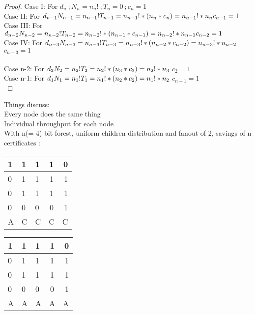 \begin{proof}

	Case I: For $d_{n}\ ; N_{n} = n_{n}!\ ; T_{n} = 0\ ; c_{n} = 1 $\\
	Case II: For $d_{n - 1}\\ N_{n - 1} = n_{n - 1}!\\ T_{n - 1} = n_{n - 1}! * (n_{n} * c_{n}) = n_{n - 1}! * n_{n}\\ c_{n - 1} = 1\\ $
	Case III: For $d_{n - 2}\\ N_{n - 2} = n_{n - 2}!\\ T_{n -2} = n_{n - 2}! * (n_{n - 1} * c_{n - 1}) = n_{n - 2}! * n_{n - 1 } \\ c_{n - 2} = 1$\\
	Case IV: For $d_{n - 3}\\ N_{n - 3} = n_{n - 3}!\\ T_{n -3} = n_{n - 3}! * (n_{n - 2} * c_{n - 2}) = n_{n - 3}! * n_{n - 2 } \\$     $c_{n - 3} = 1$\\ \\
	Case n-2: For $d_{2}\\ N_{2} = n_{2}!\\ T_{2} = n_{2}! * (n_{3} * c_{3}) = n_{2}! * n_{3} \\$  $c_{2} = 1$\\
	Case n-1: For $d_{1}\\ N_{1} = n_{1}!\\ T_{1} = n_{1}! * (n_{2} * c_{2}) = n_{1}! * n_{2} \\$  $c_{n-1} = 1$\\

\end{proof}


Things discuss:\\
	Every node does the same thing\\
	Individual throughput for each node\\

With n(= 4) bit forest, uniform children distribution and fanout of 2, savings of n certificates :

\begin{multicols}{2}

	\begin{tabular}{ l | l l c r }
	  1 & 1 & 1 & 1 & 0 \\
	  \hline
	  0 & 1 & 1 & 1 & 1 \\
	  0 & 1 & 1 & 1 & 1 \\
	  0 & 0 & 0 & 0 & 1 \\
	  \hline	
	  A & C & C & C & C\\
	\end{tabular}
\columnbreak{|}
	\begin{tabular}{ l | l l c r }
	  1 & 1 & 1 & 1 & 0 \\
	  \hline
	  0 & 1 & 1 & 1 & 1 \\
	  0 & 1 & 1 & 1 & 1 \\
	  0 & 0 & 0 & 0 & 1 \\
	  \hline	
	  A & A & A & A & A\\
	\end{tabular}
\end{multicols}

